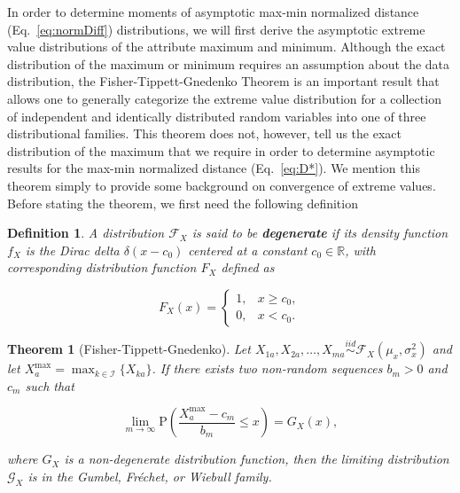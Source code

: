 \documentclass[10pt,letterpaper]{article}
\newtheorem{theorem}{Theorem}[section]
\newtheorem{definition}{Definition}[section]
\begin{document}
In order to determine moments of asymptotic max-min normalized distance (Eq.~\ref{eq:normDiff}) distributions, we will first derive the asymptotic extreme value distributions of the attribute maximum and minimum. Although the exact distribution of the maximum or minimum requires an assumption about the data distribution, the Fisher-Tippett-Gnedenko Theorem is an important result that allows one to generally categorize the extreme value distribution for a collection of independent and identically distributed random variables into one of three distributional families. This theorem does not, however, tell us the exact distribution of the maximum that we require in order to determine asymptotic results for the max-min normalized distance (Eq.~\ref{eq:D*}). We mention this theorem simply to provide some background on convergence of extreme values. Before stating the theorem, we first need the following definition
%
\begin{definition}
	A distribution $\mathcal{F}_X$ is said to be \textbf{degenerate} if its density function $f_X$ is the Dirac delta $\delta(x - c_0)$ centered at a constant $c_0 \in \mathbb{R}$, with corresponding distribution function $F_X$ defined as
	
	\[F_X(x)=\begin{cases}
	1, & x \geq c_0, \\
	0, & x < c_0.
	\end{cases}
	\]
\end{definition}
%
\begin{theorem}[Fisher-Tippett-Gnedenko]\label{thm:EVT}
	Let $X_{1a},X_{2a},\dots,X_{ma} \overset{iid}{\sim} \mathcal{F}_X\left(\mu_x,\sigma^2_x\right)$ and let $X^\text{max}_a = \displaystyle \max_{k \in \mathcal{I}}\{X_{ka}\}$. If there exists two non-random sequences $b_m>0$ and $c_m$ such that
	
	\[\lim_{m \to \infty} \text{P}\left(\frac{X^\text{max}_a - c_m}{b_m} \leq x\right) = G_X(x),\]
	
	\noindent where $G_X$ is a non-degenerate distribution function, then the limiting distribution $\mathcal{G}_X$ is in the Gumbel, Fr\'{e}chet, or Wiebull family.
\end{theorem}
\end{document}
